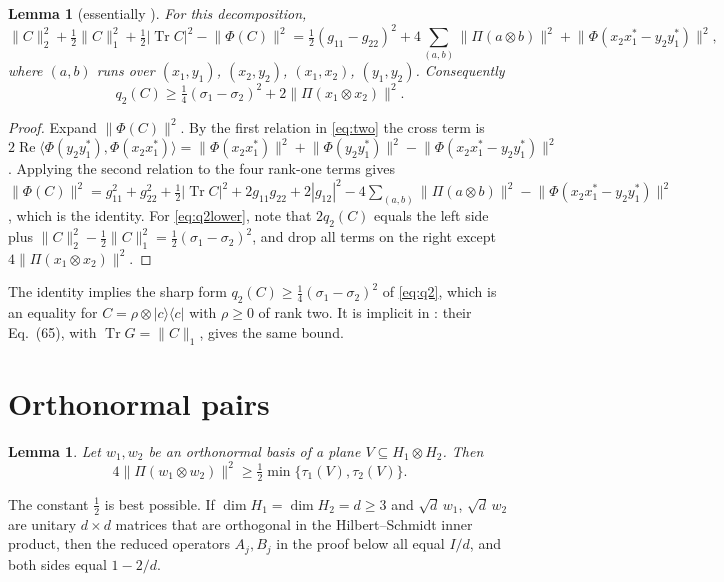 \documentclass[11pt]{article}
\newtheorem{lemma}[theorem]{Lemma}
\theoremstyle{remark}
\newcommand{\Tr}{\operatorname{Tr}}
\renewcommand{\Re}{\operatorname{Re}}
\newcommand{\norm}[1]{\lVert #1\rVert}
\begin{document}
\begin{lemma}[{essentially \cite{FHPV}}]\label{lem:sos}
For this decomposition,
\[
\norm{C}_2^2+\tfrac12\norm{C}_1^2+\tfrac12|\Tr C|^2-\norm{\Phi(C)}^2
=\tfrac12(g_{11}-g_{22})^2+4\sum_{(a,b)}\norm{\Pi(a\otimes b)}^2+\norm{\Phi(x_2x_1^*-y_2y_1^*)}^2,
\]
where $(a,b)$ runs over $(x_1,y_1)$, $(x_2,y_2)$, $(x_1,x_2)$, $(y_1,y_2)$. Consequently
\begin{equation}\label{eq:q2lower}
q_2(C)\ge\tfrac14(\sigma_1-\sigma_2)^2+2\norm{\Pi(x_1\otimes x_2)}^2 .
\end{equation}
\end{lemma}

\begin{proof}
Expand $\norm{\Phi(C)}^2$. By the first relation in \eqref{eq:two} the cross term is
$2\Re\langle\Phi(y_2y_1^*),\Phi(x_2x_1^*)\rangle=\norm{\Phi(x_2x_1^*)}^2+\norm{\Phi(y_2y_1^*)}^2
-\norm{\Phi(x_2x_1^*-y_2y_1^*)}^2$. Applying the second relation to the four rank-one terms gives
$\norm{\Phi(C)}^2=g_{11}^2+g_{22}^2+\frac12|\Tr C|^2+2g_{11}g_{22}+2|g_{12}|^2-4\sum_{(a,b)}\norm{\Pi(a\otimes b)}^2
-\norm{\Phi(x_2x_1^*-y_2y_1^*)}^2$, which is the identity. For \eqref{eq:q2lower}, note that $2q_2(C)$ equals the left
side plus $\norm{C}_2^2-\frac12\norm{C}_1^2=\frac12(\sigma_1-\sigma_2)^2$, and drop all terms on the right except
$4\norm{\Pi(x_1\otimes x_2)}^2$.
\end{proof}

The identity implies the sharp form $q_2(C)\ge\frac14(\sigma_1-\sigma_2)^2$ of \eqref{eq:q2}, which is an equality for
$C=\rho\otimes|c\rangle\langle c|$ with $\rho\ge0$ of rank two. It is implicit in \cite{FHPV}: their Eq.~(65), with
$\Tr G=\norm{C}_1$, gives the same bound.

\section{Orthonormal pairs}\label{sec:pair}

\begin{lemma}\label{lem:pair}
Let $w_1,w_2$ be an orthonormal basis of a plane $V\subseteq H_1\otimes H_2$. Then
\[
4\norm{\Pi(w_1\otimes w_2)}^2\ge\tfrac12\min\{\tau_1(V),\tau_2(V)\}.
\]
\end{lemma}

The constant $\frac12$ is best possible. If $\dim H_1=\dim H_2=d\ge3$ and $\sqrt d\,w_1$, $\sqrt d\,w_2$ are unitary
$d\times d$ matrices that are orthogonal in the Hilbert--Schmidt inner product, then the reduced operators $A_j,B_j$ in
the proof below all equal $I/d$, and both sides equal $1-2/d$.
\end{document}
